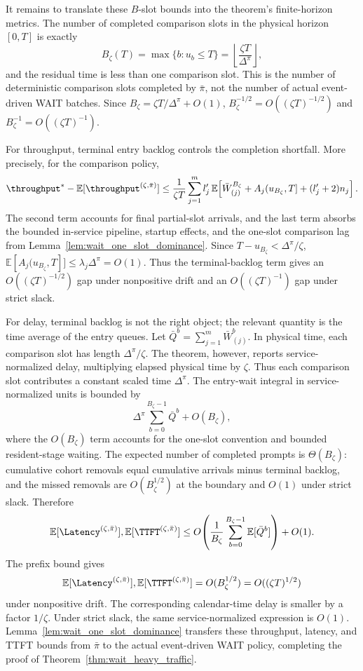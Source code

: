 It remains to translate these \(B\)-slot bounds into the theorem's finite-horizon metrics. The number of completed comparison slots in the physical horizon \([0,T]\) is exactly
\[
    B_\zeta(T)=\max\{b:u_b\le T\}
    =\left\lfloor\frac{\zeta T}{\Delta^\pi}\right\rfloor,
\]
and the residual time is less than one comparison slot. This is the number of deterministic comparison slots completed by \(\bar\pi\), not the number of actual event-driven WAIT batches. Since \(B_\zeta=\zeta T/\Delta^\pi+O(1)\), \(B_\zeta^{-1/2}=O((\zeta T)^{-1/2})\) and \(B_\zeta^{-1}=O((\zeta T)^{-1})\).

For throughput, terminal entry backlog controls the completion shortfall. More precisely, for the comparison policy,
\[
    \throughput^*-\mathbb{E}[\throughput^{(\zeta,\bar\pi)}]
    \le
    \frac{1}{\zeta T}\sum_{j=1}^m l_j^\prime\,
    \mathbb{E}\!\left[
    \bar W^{B_\zeta}_{(j)}
    +A_j(u_{B_\zeta},T]
    +(l_j^\prime+2)n_j
    \right].
\]
The second term accounts for final partial-slot arrivals, and the last term absorbs the bounded in-service pipeline, startup effects, and the one-slot comparison lag from Lemma~\ref{lem:wait_one_slot_dominance}. Since \(T-u_{B_\zeta}<\Delta^\pi/\zeta\), \(\mathbb{E}[A_j(u_{B_\zeta},T]]\le \lambda_j\Delta^\pi=O(1)\). Thus the terminal-backlog term gives an \(O((\zeta T)^{-1/2})\) gap under nonpositive drift and an \(O((\zeta T)^{-1})\) gap under strict slack.

For delay, terminal backlog is not the right object; the relevant quantity is the time average of the entry queues. Let \(\bar Q^b=\sum_{j=1}^m \bar W^b_{(j)}\). In physical time, each comparison slot has length \(\Delta^\pi/\zeta\). The theorem, however, reports service-normalized delay, multiplying elapsed physical time by \(\zeta\). Thus each comparison slot contributes a constant scaled time \(\Delta^\pi\). The entry-wait integral in service-normalized units is bounded by
\[
    \Delta^\pi\sum_{b=0}^{B_\zeta-1}\bar Q^b+O(B_\zeta),
\]
where the \(O(B_\zeta)\) term accounts for the one-slot convention and bounded resident-stage waiting. The expected number of completed prompts is \(\Theta(B_\zeta)\): cumulative cohort removals equal cumulative arrivals minus terminal backlog, and the missed removals are \(O(B_\zeta^{1/2})\) at the boundary and \(O(1)\) under strict slack. Therefore
\[
    \mathbb{E}[\Latency^{(\zeta,\bar\pi)}],
    \mathbb{E}[\TTFT^{(\zeta,\bar\pi)}]
    \le
    O\!\left(
    \frac{1}{B_\zeta}\sum_{b=0}^{B_\zeta-1}
    \mathbb{E}[\bar Q^b]
    \right)+O(1).
\]
The prefix bound gives
\[
    \mathbb{E}[\Latency^{(\zeta,\bar\pi)}],
    \mathbb{E}[\TTFT^{(\zeta,\bar\pi)}]
    =
    O(B_\zeta^{1/2})
    =
    O((\zeta T)^{1/2})
\]
under nonpositive drift. The corresponding calendar-time delay is smaller by a factor \(1/\zeta\). Under strict slack, the same service-normalized expression is \(O(1)\). Lemma~\ref{lem:wait_one_slot_dominance} transfers these throughput, latency, and TTFT bounds from \(\bar\pi\) to the actual event-driven WAIT policy, completing the proof of Theorem~\ref{thm:wait_heavy_traffic}.
